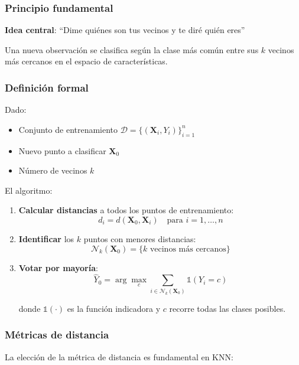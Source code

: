 \documentclass[
  doc,
  floatsintext,
  longtable,
  a4paper,
  nolmodern,
  notxfonts,
  notimes,
  12pt,
  colorlinks=true,linkcolor=blue,citecolor=blue,urlcolor=blue]{apa7}
\providecommand{\tightlist}{%
  \setlength{\itemsep}{0pt}\setlength{\parskip}{0pt}}
\begin{document}
\subsubsection{Principio fundamental}\label{principio-fundamental}

\textbf{Idea central}: ``Dime quiénes son tus vecinos y te diré quién
eres''

Una nueva observación se clasifica según la clase más común entre sus
\(k\) vecinos más cercanos en el espacio de características.

\subsubsection{Definición formal}\label{definiciuxf3n-formal}

Dado:

\begin{itemize}
\tightlist
\item
  Conjunto de entrenamiento
  \(\mathcal{D} = \{(\mathbf{X}_i, Y_i)\}_{i=1}^{n}\)
\item
  Nuevo punto a clasificar \(\mathbf{X}_0\)
\item
  Número de vecinos \(k\)
\end{itemize}

El algoritmo:

\begin{enumerate}
\def\labelenumi{\arabic{enumi}.}
\item
  \textbf{Calcular distancias} a todos los puntos de entrenamiento: \[
  d_i = d(\mathbf{X}_0, \mathbf{X}_i) \quad \text{para } i = 1, \ldots, n
  \]
\item
  \textbf{Identificar} los \(k\) puntos con menores distancias: \[
  \mathcal{N}_k(\mathbf{X}_0) = \{k \text{ vecinos más cercanos}\}
  \]
\item
  \textbf{Votar por mayoría}: \[
  \hat{Y}_0 = \arg\max_{c} \sum_{i \in \mathcal{N}_k(\mathbf{X}_0)} \mathbb{1}(Y_i = c)
  \]

  donde \(\mathbb{1}(\cdot)\) es la función indicadora y \(c\) recorre
  todas las clases posibles.
\end{enumerate}

\subsubsection{Métricas de distancia}\label{muxe9tricas-de-distancia}

La elección de la métrica de distancia es fundamental en KNN:
\end{document}
